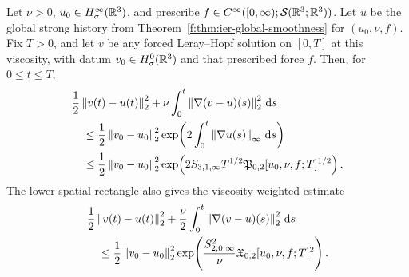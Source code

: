 \begin{theorem}
\label{f:thm:app-relative-energy}
Let \(\nu>0\), \(u_0\in H^\infty_\sigma(\mathbb R^3)\), and prescribe
\(f\in C^\infty([0,\infty);\mathcal S(\mathbb R^3;\mathbb R^3))\).  Let \(u\) be the
global strong history from Theorem~\ref{f:thm:ier-global-smoothness} for
\((u_0,\nu,f)\).  Fix \(T>0\), and let \(v\) be any forced Leray--Hopf
solution on \([0,T]\) at this viscosity, with datum
\(v_0\in H^0_\sigma(\mathbb R^3)\) and that prescribed force \(f\).  Then,
for \(0\le t\le T\),
\begin{align}
 &\frac12\left\lVert v(t)-u(t)\right\rVert_2^2
 +\nu\int_0^t\left\lVert \nabla(v-u)(s)\right\rVert_2^2\,\mathrm d s
 \notag\\
 &\quad\le
 \frac12\left\lVert v_0-u_0\right\rVert_2^2
 \exp\!\left(
 2\int_0^t\left\lVert \nabla u(s)\right\rVert_\infty\,\mathrm d s
 \right)
 \label{f:eq:app-relative-energy-action}\\
 &\quad\le
 \frac12\left\lVert v_0-u_0\right\rVert_2^2
 \exp\!\left(
 2S_{3,1,\infty}T^{1/2}
 \mathfrak P_{0,2}[u_0,\nu,f;T]^{1/2}
 \right).
 \label{f:eq:app-relative-energy-producer}
\end{align}
The lower spatial rectangle also gives the viscosity-weighted estimate
\begin{align}
 &\frac12\left\lVert v(t)-u(t)\right\rVert_2^2
 +\frac\nu2\int_0^t\left\lVert \nabla(v-u)(s)\right\rVert_2^2\,\mathrm d s
 \notag\\
 &\quad\le
 \frac12\left\lVert v_0-u_0\right\rVert_2^2
 \exp\!\left(
 \frac{S_{2,0,\infty}^2}{\nu}
 \mathfrak X_{0,2}[u_0,\nu,f;T]^2
 \right).
 \label{f:eq:app-relative-energy-low-rectangle}
\end{align}
\end{theorem}

